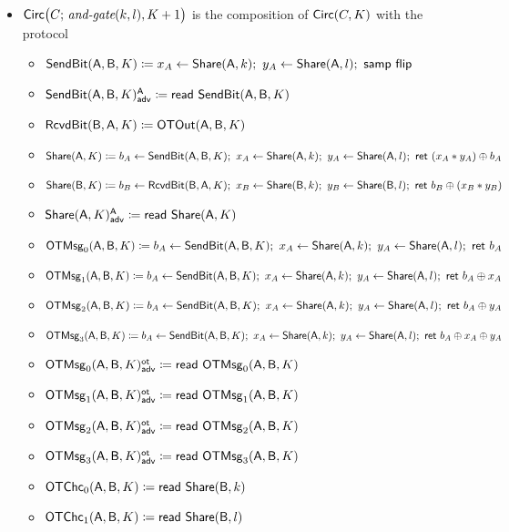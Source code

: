 \begin{itemize}
\item $\Circ\big(C; \, \andgate(k,l),K+1\big)$ is the composition of $\Circ(C,K)$ with the protocol
\begin{itemize}
\item $\SendBit(\A,\B,K) \coloneqq x_A \leftarrow \Share(\A,k); \ y_A \leftarrow \Share(\A,l); \ \samp{\flip}$
\item {\color{blue} $\LeakSendBit(\A,\B,K)^\A_\adv \coloneqq \read{\SendBit(\A,\B,K)}$}\smallskip
\item $\RcvdBit(\B,\A,K) \coloneqq \OTOut(\A,\B,K)$\smallskip
\item $\Share(\A,K) \coloneqq b_A \leftarrow \SendBit(\A,\B,K); \ x_A \leftarrow \Share(\A,k); \ y_A \leftarrow \Share(\A,l); \ \ret{(x_A * y_A) \oplus b_A}$
\item $\Share(\B,K) \coloneqq b_B \leftarrow \RcvdBit(\B,\A,K); \ x_B \leftarrow \Share(\B,k); \ y_B \leftarrow \Share(\B,l); \ \ret{b_B \oplus (x_B * y_B)}$
\item {\color{blue} $\LeakShare(\A,K)^\A_\adv \coloneqq \read{\Share(\A,K)}$}\smallskip
\item $\OTMsg_0(\A,\B,K) \coloneqq b_A \leftarrow \SendBit(\A,\B,K); \ x_A \leftarrow \Share(\A,k); \ y_A \leftarrow \Share(\A,l); \ \ret{b_A}$
\item $\OTMsg_1(\A,\B,K) \coloneqq b_A \leftarrow \SendBit(\A,\B,K); \ x_A \leftarrow \Share(\A,k); \ y_A \leftarrow \Share(\A,l); \ \ret{b_A \oplus x_A}$
\item $\OTMsg_2(\A,\B,K) \coloneqq b_A \leftarrow \SendBit(\A,\B,K); \ x_A \leftarrow \Share(\A,k); \ y_A \leftarrow \Share(\A,l); \ \ret{b_A \oplus y_A}$
\item $\OTMsg_3(\A,\B,K) \coloneqq b_A \leftarrow \SendBit(\A,\B,K); \ x_A \leftarrow \Share(\A,k); \ y_A \leftarrow \Share(\A,l); \ \ret{b_A \oplus x_A \oplus y_A}$\smallskip
\item {\color{blue} $\LeakOTMsg_0(\A,\B,K)^\ot_\adv \coloneqq \read{\OTMsg_0(\A,\B,K)}$}
\item {\color{blue} $\LeakOTMsg_1(\A,\B,K)^\ot_\adv \coloneqq \read{\OTMsg_1(\A,\B,K)}$}
\item {\color{blue} $\LeakOTMsg_2(\A,\B,K)^\ot_\adv \coloneqq \read{\OTMsg_2(\A,\B,K)}$}
\item {\color{blue} $\LeakOTMsg_3(\A,\B,K)^\ot_\adv \coloneqq \read{\OTMsg_3(\A,\B,K)}$}\smallskip
\item $\OTChc_0(\A,\B,K) \coloneqq \read{\Share(\B,k)}$
\item $\OTChc_1(\A,\B,K) \coloneqq \read{\Share(\B,l)}$\smallskip

\end{itemize}
\end{itemize}
